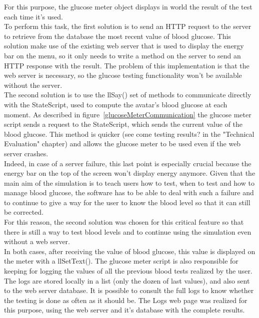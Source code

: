 {\begin{itemize}
\begin{itemize}
For this purpose, the glucose meter object displays in world the result of the test each time it's used. \\
To perform this task, the first solution is to send an HTTP request to the server to retrieve from the database the most recent value of blood glucose. 
This solution make use of the existing web server that is used to display the energy bar on the menu, so it only needs to write a method on the server to send an HTTP response with the result. 
The problem of this implementation is that the web server is necessary, so the glucose testing functionality won't be available without the server. \\

The second solution is to use the llSay() set of methods to communicate directly with the StateScript, used to compute the avatar's blood glucose at each moment. 
As described in figure~\ref{glucoseMeterCommunication} the glucose meter script sends a request to the StateScript, which sends the current value of the blood glucose.
This method is quicker (see come testing results? in the "Technical Evaluation" chapter) and allows the glucose meter to be used even if the web server crashes.\\

Indeed, in case of a server failure, this last point is especially crucial because the energy bar on the top of the screen won't display energy anymore. 
Given that the main aim of the simulation is to teach users how to test, when to test and how to manage blood glucose, the software has to be able to deal with such a failure and to continue to give a way for the user to know the blood level so that it can still be corrected. \\

For this reason, the second solution was chosen for this critical feature so that there is still a way to test blood levels and to continue using the simulation even without a web server.\\


In both cases, after receiving the value of blood glucose, this value is displayed on the meter with a llSetText(). The glucose meter script is also responsible for keeping for logging the values of all the previous blood tests realized by the user. The logs are stored locally in a list (only the dozen of last values), and also sent to the web server database. 
It is possible to consult the full logs to know whether the testing is done as often as it should be. The Logs web page was realized for this purpose, using the web server and it's database with the complete results.



\end{itemize}
\end{itemize}}
